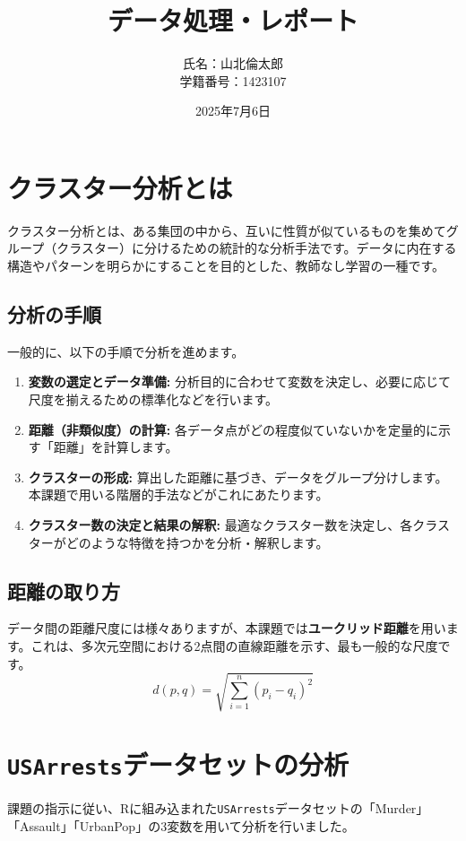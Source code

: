\documentclass{article}
\title{データ処理・レポート}
\author{氏名：山北倫太郎 \\ 学籍番号：1423107}
\date{2025年7月6日}
\begin{document}
\maketitle
\tableofcontents %
\newpage

\section{クラスター分析とは}

クラスター分析とは、ある集団の中から、互いに性質が似ているものを集めてグループ（クラスター）に分けるための統計的な分析手法です。データに内在する構造やパターンを明らかにすることを目的とした、教師なし学習の一種です。

\subsection*{分析の手順}
一般的に、以下の手順で分析を進めます。
\begin{enumerate}
    \item \textbf{変数の選定とデータ準備:} 分析目的に合わせて変数を決定し、必要に応じて尺度を揃えるための標準化などを行います。
    \item \textbf{距離（非類似度）の計算:} 各データ点がどの程度似ていないかを定量的に示す「距離」を計算します。
    \item \textbf{クラスターの形成:} 算出した距離に基づき、データをグループ分けします。本課題で用いる階層的手法などがこれにあたります。
    \item \textbf{クラスター数の決定と結果の解釈:} 最適なクラスター数を決定し、各クラスターがどのような特徴を持つかを分析・解釈します。
\end{enumerate}

\subsection*{距離の取り方}
データ間の距離尺度には様々ありますが、本課題では\textbf{ユークリッド距離}を用います。これは、多次元空間における2点間の直線距離を示す、最も一般的な尺度です。
$$
d(p, q) = \sqrt{\sum_{i=1}^{n} (p_i - q_i)^2}
$$


\section{\texttt{USArrests}データセットの分析}

課題の指示に従い、Rに組み込まれた\texttt{USArrests}データセットの「Murder」「Assault」「UrbanPop」の3変数を用いて分析を行いました。
\end{document}

